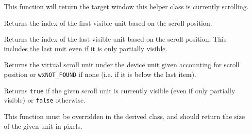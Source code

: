 \label{wxvarscrollhelperbasegettargetwindow}


This function will return the target window this helper class is currently
scrolling.




\label{wxvarscrollhelperbasegetvisiblebegin}


Returns the index of the first visible unit based on the scroll position.


\label{wxvarscrollhelperbasegetvisibleend}


Returns the index of the last visible unit based on the scroll position. This
includes the last unit even if it is only partially visible.


\label{wxvarscrollhelperbasevirtualhittest}


Returns the virtual scroll unit under the device unit given accounting for
scroll position or {\tt wxNOT\_FOUND} if none (i.e. if it is below the last
item).


\label{wxvarscrollhelperbaseisvisible}


Returns {\tt true} if the given scroll unit is currently visible (even if only
partially visible) or {\tt false} otherwise.


\label{wxvarscrollhelperbaseongetunitsize}


This function must be overridden in the derived class, and should return the
size of the given unit in pixels.


\label{wxvarscrollhelperbaseongetunitssizehint}

